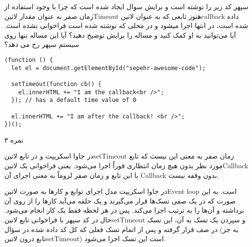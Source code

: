\documentclass[../main.tex]{subfiles}
\begin{document}

سپهر کد زیر را نوشته است و برایش سوال ایجاد شده است که چرا با وجود استفاده از زمان صفر به عنوان مقدار ‌لاتین{Timeout}
هنوز تابعی که به عنوان ‌لاتین{callback} داده شده است، در انتها اجرا میشود و در محلی که نوشته شده است فراخوانی نشده است. آیا می‌توانید به او کمک کنید و مساله را برایش توضیح دهید؟
آیا این مساله تنها روی سیستم سپهر رخ می دهد؟

\begin{latin}
\begin{verbatim}
(function () {
  let el = document.getElementById("sepehr-awesome-code");

  setTimeout(function cb() {
    el.innerHTML += "I am the callback<br />";
  }); // has a default time value of 0

  el.innerHTML += "I am after the callback! <br />";
})();
\end{verbatim}
\end{latin}

۳ نمره

\begin{answer}

در جاوا اسکریپت و در تابع ‌لاتین{setTimeout} زمان صفر به معنی این نیست که تابع مورد نظر بدون هیچ زمان انتظاری فوراً اجرا می‌شود.
یعنی فراخوانی یک ‌لاتین{Callback} با این تابع و زمان صفر لزوماً به معنی اجرای آن Callback بدون وقفه نیست.

در جاوا اسکریپت مدل اجرای توابع و کارها به صورت ‌لاتین{Event loop} است. به این صورت که در یک صفی تسک‌ها قرار می‌گیرند و یک حلقه می‌آید کارها را از روی آن برداشته و آن‌ها را به ترتیب اجرا می‌کند.
پس در هر لحظه فقط یک کار انجام می‌شود.
حال در کد سپهر با فراخوانی تابع ‌لاتین{setTimeout} و سپردن یک تسک به آن، این تسک در صف قرار گرفته و پس از اتمام تسک فعلی که کل کد داده شده در سؤال (به جز تابع درون ‌لاتین{setTimeout}) است این تسک اجرا می‌شود.

\end{answer}
\end{document}
